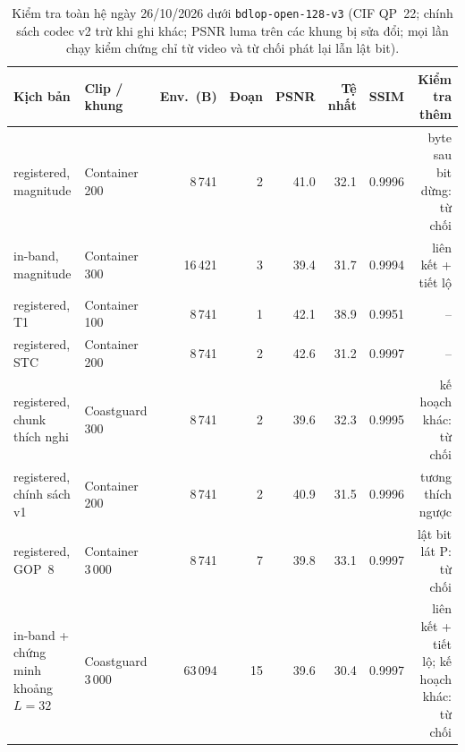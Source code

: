\begin{table}[t]
\centering
\caption{Kiểm tra toàn hệ ngày 26/10/2026 dưới \texttt{bdlop-open-128-v3}
(CIF QP~22; chính sách codec v2 trừ khi ghi khác; PSNR luma trên các khung bị
sửa đổi; mọi lần chạy kiểm chứng chỉ từ video và từ chối phát lại lẫn lật bit).}
\label{tab:system-v3}
\small\setlength{\tabcolsep}{3.5pt}
\begin{tabular}{llrrrrrr}
\toprule
Kịch bản & Clip / khung & Env.\ (B) & Đoạn & PSNR & Tệ nhất & SSIM & Kiểm tra thêm \\
\midrule
registered, magnitude & Container 200 & 8\,741 & 2 & 41.0 & 32.1 & 0.9996 & byte sau bit dừng: từ chối \\
in-band, magnitude & Container 300 & 16\,421 & 3 & 39.4 & 31.7 & 0.9994 & liên kết + tiết lộ \\
registered, T1 & Container 100 & 8\,741 & 1 & 42.1 & 38.9 & 0.9951 & -- \\
registered, STC & Container 200 & 8\,741 & 2 & 42.6 & 31.2 & 0.9997 & -- \\
registered, chunk thích nghi & Coastguard 300 & 8\,741 & 2 & 39.6 & 32.3 & 0.9995 & kế hoạch khác: từ chối \\
registered, chính sách v1 & Container 200 & 8\,741 & 2 & 40.9 & 31.5 & 0.9996 & tương thích ngược \\
registered, GOP~8 & Container 3\,000 & 8\,741 & 7 & 39.8 & 33.1 & 0.9997 & lật bit lát P: từ chối \\
in-band + chứng minh khoảng $L{=}32$ & Coastguard 3\,000 & 63\,094 & 15 & 39.6 & 30.4 & 0.9997 & liên kết + tiết lộ; kế hoạch khác: từ chối \\
\bottomrule
\end{tabular}
\end{table}
